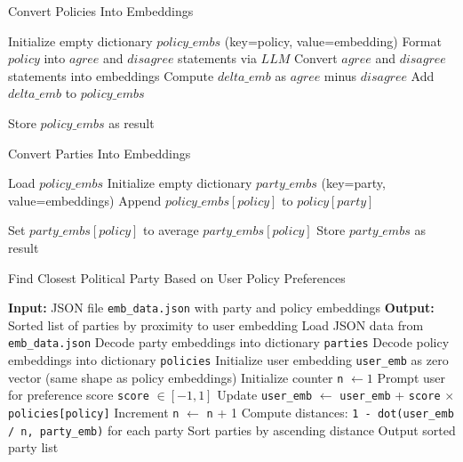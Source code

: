 \documentclass{article}
\begin{document}
\begin{algorithm}
\caption{Convert Policies Into Embeddings}
\begin{algorithmic}[1]
\State Initialize empty dictionary $policy\_embs$ (key=policy, value=embedding)
        \State Format $policy$ into $agree$ and $disagree$ statements via $LLM$
        \State Convert $agree$ and $disagree$ statements into embeddings
        \State Compute $delta\_emb$ as $agree$ minus $disagree$
        \State Add $delta\_emb$ to $policy\_embs$
    \EndFor
\EndFor

\State Store $policy\_embs$ as result
\end{algorithmic}
\end{algorithm}


\begin{algorithm}
\caption{Convert Parties Into Embeddings}
\begin{algorithmic}[1]
\State Load $policy\_embs$
\State Initialize empty dictionary $party\_embs$ (key=party, value=embeddings)
            \State Append $policy\_embs[policy]$ to $policy[party]$
        \EndIf 
    \EndFor
\EndFor

    \State Set $party\_embs[policy]$ to average $party\_embs[policy]$
\EndFor
\State Store $party\_embs$ as result
\end{algorithmic}
\end{algorithm}


\begin{algorithm}
\caption{Find Closest Political Party Based on User Policy Preferences}
\begin{algorithmic}[1]
\State \textbf{Input:} JSON file \texttt{emb\_data.json} with party and policy embeddings
\State \textbf{Output:} Sorted list of parties by proximity to user embedding
\State Load JSON data from \texttt{emb\_data.json}
\State Decode party embeddings into dictionary \texttt{parties}
\State Decode policy embeddings into dictionary \texttt{policies}
\State Initialize user embedding \texttt{user\_emb} as zero vector (same shape as policy embeddings)
\State Initialize counter \texttt{n} $\gets 1$
    \State Prompt user for preference score \texttt{score} $\in [-1, 1]$
    \State Update \texttt{user\_emb} $\gets$ \texttt{user\_emb} + \texttt{score} $\times$ \texttt{policies[policy]}
    \State Increment \texttt{n} $\gets$ \texttt{n} + 1
    \State Compute distances: \texttt{1 - dot(user\_emb / n, party\_emb)} for each party
    \State Sort parties by ascending distance
    \State Output sorted party list
\EndFor
\end{algorithmic}
\end{algorithm}
\end{document}
